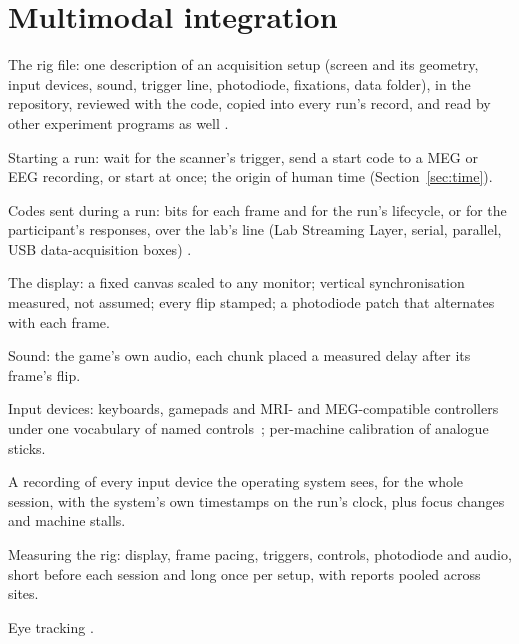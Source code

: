 \section{Multimodal integration}
\label{sec:multimodal}

\begin{outline}
  \item The rig file: one description of an acquisition setup (screen and its geometry, input devices, sound, trigger line, photodiode, fixations, data folder), in the repository, reviewed with the code, copied into every run's record, and read by other experiment programs as well .
  \item Starting a run: wait for the scanner's trigger, send a start code to a MEG or EEG recording, or start at once; the origin of human time (Section~\ref{sec:time}).
  \item Codes sent during a run: bits for each frame and for the run's lifecycle, or for the participant's responses, over the lab's line (Lab Streaming Layer, serial, parallel, USB data-acquisition boxes) .
  \item The display: a fixed canvas scaled to any monitor; vertical synchronisation measured, not assumed; every flip stamped; a photodiode patch that alternates with each frame.
  \item Sound: the game's own audio, each chunk placed a measured delay after its frame's flip.
  \item Input devices: keyboards, gamepads and MRI- and MEG-compatible controllers under one vocabulary of named controls~\citep{harel2023controller}; per-machine calibration of analogue sticks.
  \item A recording of every input device the operating system sees, for the whole session, with the system's own timestamps on the run's clock, plus focus changes and machine stalls.
  \item Measuring the rig: display, frame pacing, triggers, controls, photodiode and audio, short before each session and long once per setup, with reports pooled across sites.
  \item Eye tracking .
\end{outline}
